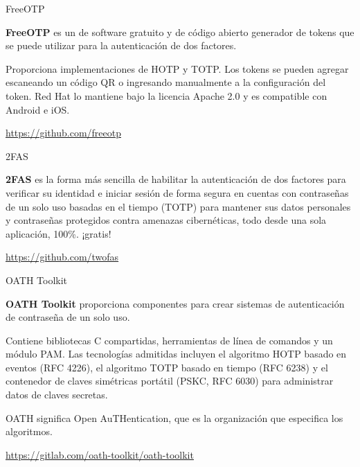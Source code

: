 \begin{frame}[c]{FreeOTP}

  \textbf{FreeOTP} es un de software gratuito y de código abierto generador
  de tokens que se puede utilizar para la autenticación de dos factores.

  \vspace{\baselineskip}
  Proporciona implementaciones de HOTP y TOTP. Los tokens se pueden agregar
  escaneando un código QR o ingresando manualmente a la configuración del
  token. Red Hat lo mantiene bajo la licencia Apache 2.0 y es compatible
  con Android e iOS.

  \vspace{\baselineskip}
  \href{https://github.com/freeotp}{https://github.com/freeotp}
\end{frame}

\begin{frame}[c]{2FAS}

  \textbf{2FAS} es la forma más sencilla de habilitar la autenticación
  de dos factores para verificar su identidad e iniciar sesión de
  forma segura en cuentas con contraseñas de un solo uso basadas en el
  tiempo (TOTP) para mantener sus datos personales y contraseñas
  protegidos contra amenazas cibernéticas,
  todo desde una sola aplicación, 100\%. ¡gratis!

  \vspace{\baselineskip}
  \href{https://github.com/twofas}{https://github.com/twofas}

\end{frame}

\begin{frame}[c]{OATH Toolkit}

  \textbf{OATH Toolkit} proporciona componentes para crear sistemas de
  autenticación de contraseña de un solo uso.

  \vspace{\baselineskip}
  Contiene bibliotecas C compartidas, herramientas de línea de comandos y
  un módulo PAM. Las tecnologías admitidas incluyen el algoritmo HOTP
  basado en eventos (RFC 4226), el algoritmo TOTP basado en tiempo
  (RFC 6238) y el contenedor de claves simétricas portátil (PSKC, RFC 6030)
  para administrar datos de claves secretas.

  \vspace{\baselineskip}
  OATH significa Open AuTHentication, que es la organización que
  especifica los algoritmos.

  \vspace{\baselineskip}
  \href{https://gitlab.com/oath-toolkit/oath-toolkit}{https://gitlab.com/oath-toolkit/oath-toolkit}
\end{frame}

